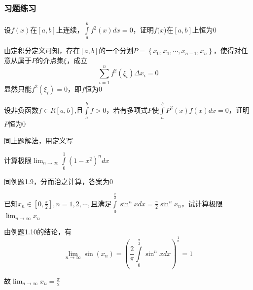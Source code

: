 \documentclass[lang=cn,10pt]{elegantbook}
\begin{document}
\subsubsection{习题练习}
\begin{example}
	设$f(x)$在$[a,b]$上连续，$\int\limits_a^b{f^2\left( x \right) dx}=0$，证明$f(x$)在$[a,b]$上恒为0
\end{example}
\begin{solution}
	
	由定积分定义可知，存在$[a,b]$的一个分划$P=\left\{ x_0,x_1,\cdots ,x_{n-1},x_n \right\} $，使得对任意从属于$P$的介点集$\xi$，成立
	\begin{equation*}
		\sum_{i=1}^n{f^{2}\left( \xi _i \right) \varDelta x_i}=0
	\end{equation*}
	显然只能$f^{2}\left( \xi _i \right)=0$，即$f$恒为$0$
\end{solution}
\begin{example}
	设非负函数$f$$\in R[a,b]$,且$\int\limits_a^b{f}>0$，若有多项式$P$使$\int\limits_a^b{P^2\left( x \right) f\left( x \right) dx}=0$，证明$P$恒为0
\end{example}
\begin{solution}
	
	同上题解法，用定义写
\end{solution}
\begin{example}
	计算极限$\lim_{n\rightarrow \infty} \int\limits_0^1{\left( 1-x^2 \right) ^ndx}$
\end{example}
\begin{solution}
	
	同例题1.9，分而治之计算，答案为0
\end{solution}
\begin{example}
	已知$x_{n}\in [0,\frac{\pi}{2}],n=1,2,\cdots,$且满足$\int\limits_0^{\frac{\pi}{2}}{\sin ^nxdx}=\frac{\pi}{2}\sin ^nx_n$，试计算极限$\lim_{n\rightarrow \infty} x_n$
\end{example}
\begin{solution}
	
	由例题1.10的结论，有
	\begin{equation*}
		\lim_{n\rightarrow \infty} \sin \left( x_n \right) =\left( \frac{2}{\pi}\int\limits_0^{\frac{\pi}{2}}{\sin ^nxdx} \right) ^{\frac{1}{n}}=1
	\end{equation*}
	
	故$\lim_{n\rightarrow \infty} x_n=\frac{\pi}{2}$
\end{solution}
\end{document}
